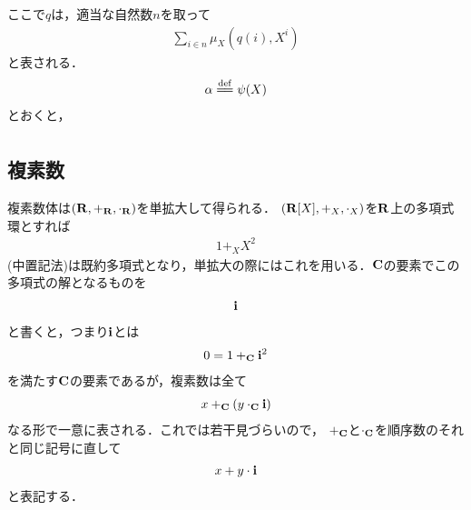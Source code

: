 	ここで$q$は，適当な自然数$n$を取って
	\begin{align}
		\sum_{i \in n} \mu_X \left(q(i),X^i\right)
	\end{align}
	と表される．
	\begin{align}
		\alpha \defeq \psi(X)
	\end{align}
	とおくと，
	\begin{align}
	\end{align}
	
\subsection{複素数}
	複素数体は$(\mathbf{R},+_{\mathbf{R}},\cdot_{\mathbf{R}})$を単拡大して得られる．
	$(\mathbf{R}[X],+_X,\cdot_X)$を$\mathbf{R}$上の多項式環とすれば
	\begin{align}
		1 +_X X^2
	\end{align}
	(中置記法)は既約多項式となり，単拡大の際にはこれを用いる．$\mathbf{C}$の要素でこの多項式の解となるものを
	\begin{align}
		\mathbf{i}
	\end{align}
	と書くと，つまり$\mathbf{i}$とは
	\begin{align}
		0 = 1 +_{\mathbf{C}} \mathbf{i}^2
	\end{align}
	を満たす$\mathbf{C}$の要素であるが，複素数は全て
	\begin{align}
		x +_{\mathbf{C}} (y \cdot_{\mathbf{C}} \mathbf{i})
	\end{align}
	なる形で一意に表される．これでは若干見づらいので，
	$+_{\mathbf{C}}$と$\cdot_{\mathbf{C}}$を順序数のそれと同じ記号に直して
	\begin{align}
		x + y \cdot \mathbf{i}
	\end{align}
	と表記する．

\newpage
